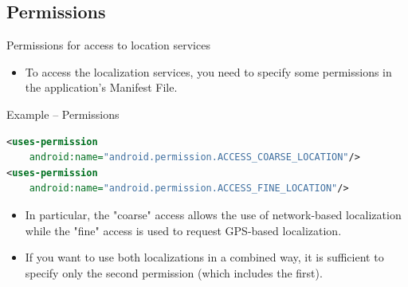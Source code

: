 \documentclass{beamer}
\begin{document}
\subsection{Permissions}

  \begin{frame}[fragile]{Permissions for access to location services}
    \begin{itemize}
      \item To access the localization services, you need to specify some
      permissions in the application's Manifest File.
    \end{itemize}

    \begin{exampleblock}{Example -- Permissions}
      \begin{lstlisting}[language=XML] 
<uses-permission
    android:name="android.permission.ACCESS_COARSE_LOCATION"/>
<uses-permission 
    android:name="android.permission.ACCESS_FINE_LOCATION"/>
      \end{lstlisting}
    \end{exampleblock}

    \begin{itemize}
      \item In particular, the "coarse" access allows the use of network-based
      localization while the "fine" access is used to request GPS-based
      localization.
      \item If you want to use both localizations in a combined way, it is
      sufficient to specify only the second permission (which includes the
      first).
    \end{itemize}
  \end{frame}
\end{document}
